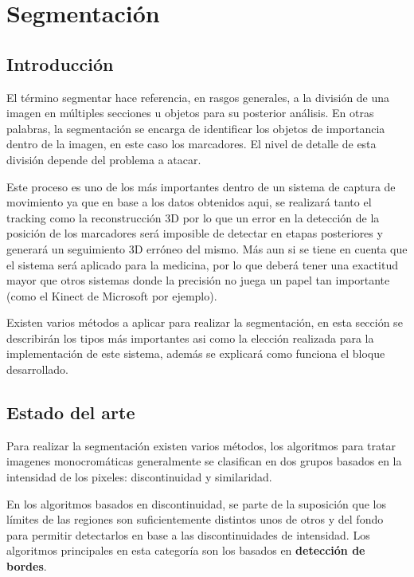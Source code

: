 \section{Segmentación}

\subsection{Introducción}

El término segmentar hace referencia, en rasgos generales, a la división de una imagen en múltiples secciones u objetos para su posterior análisis. En otras palabras, la segmentación se encarga de identificar los objetos de importancia dentro de la imagen, en este caso los marcadores. El nivel de detalle de esta división depende del problema a atacar.

Este proceso es uno de los más importantes dentro de un sistema de captura de movimiento ya que en base a los datos obtenidos aqui, se realizará tanto el tracking como la reconstrucción 3D por lo que un error en la detección de la posición de los marcadores será imposible de detectar en etapas posteriores y generará un seguimiento 3D erróneo del mismo. Más aun si se tiene en cuenta que el sistema será aplicado para la medicina, por lo que deberá tener una exactitud mayor que otros sistemas donde la precisión no juega un papel tan importante (como el Kinect de Microsoft\cite{kinect} por ejemplo).

Existen varios métodos a aplicar para realizar la segmentación, en esta sección se describirán los tipos más importantes asi como la elección realizada para la implementación de este sistema, además se explicará como funciona el bloque desarrollado.

\subsection{Estado del arte}

Para realizar la segmentación existen varios métodos, los algoritmos para tratar imagenes monocromáticas generalmente se clasifican en dos grupos basados en la intensidad de los pixeles: discontinuidad y similaridad. 

En los algoritmos basados en discontinuidad, se parte de la suposición que los límites de las regiones son suficientemente distintos unos de otros y del fondo para permitir detectarlos en base a las discontinuidades de intensidad. Los algoritmos principales en esta categoría son los basados en \textbf{detección de bordes}.

